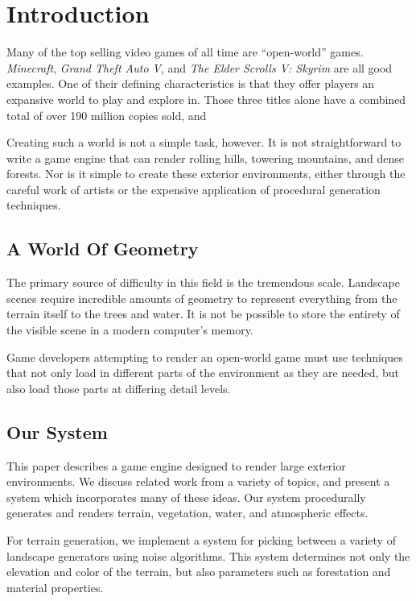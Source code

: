 
\chapter{Introduction}

Many of the top selling video games of all time are ``open-world'' games.
{\em Minecraft}, {\em Grand Theft Auto V}, and {\em The Elder Scrolls V: Skyrim} are all good examples.
One of their defining characteristics is that they offer players an expansive world to play and explore in.
Those three titles alone have a combined total of over 190 million copies sold, and

Creating such a world is not a simple task, however.
It is not straightforward to write a game engine that can render rolling hills, towering mountains, and dense forests.
Nor is it simple to create these exterior environments, either through the careful work of artists or the expensive application of procedural generation techniques.


\section{A World Of Geometry}

The primary source of difficulty in this field is the tremendous scale.
Landscape scenes require incredible amounts of geometry to represent everything from the terrain itself to the trees and water.
It is not be possible to store the entirety of the visible scene in a modern computer's memory.

Game developers attempting to render an open-world game must use techniques that not only load in different parts of the environment as they are needed, but also load those parts at differing detail levels.


\section{Our System}

This paper describes a game engine designed to render large exterior environments.
We discuss related work from a variety of topics, and present a system which incorporates many of these ideas.
Our system procedurally generates and renders terrain, vegetation, water, and atmospheric effects.

For terrain generation, we implement a system for picking between a variety of landscape generators using noise algorithms.
This system determines not only the elevation and color of the terrain, but also parameters such as forestation and material properties.

